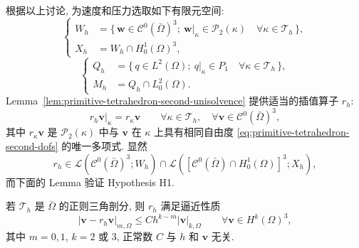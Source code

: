 根据以上讨论, 为速度和压力选取如下有限元空间:
\begin{equation}\label{eq:primitive-tetrahedron-second-velocity-spaces}
\left\{
\begin{aligned}
W_h&=\{\,\mathbf w\in\mathcal C^0(\bar\Omega)^3;
\ \mathbf w|_\kappa\in\mathcal P_2(\kappa)
\quad\forall\kappa\in\mathcal T_h\,\},\\
X_h&=W_h\cap H_0^1(\Omega)^3,
\end{aligned}
\right.
\end{equation}
\begin{equation}\label{eq:primitive-tetrahedron-second-pressure-spaces}
\left\{
\begin{aligned}
Q_h&=\{\,q\in L^2(\Omega);
\ q|_\kappa\in P_1\quad\forall\kappa\in\mathcal T_h\,\},\\
M_h&=Q_h\cap L_0^2(\Omega).
\end{aligned}
\right.
\end{equation}
Lemma~\ref{lem:primitive-tetrahedron-second-unisolvence} 提供适当的插值算子
$r_h$:
\[
r_h\mathbf v|_\kappa=r_\kappa\mathbf v
\qquad\forall\kappa\in\mathcal T_h,
\quad\forall\mathbf v\in\mathcal C^0(\bar\Omega)^3,
\]
其中 $r_\kappa\mathbf v$ 是 $\mathcal P_2(\kappa)$ 中与 $\mathbf v$
在 $\kappa$ 上具有相同自由度
\eqref{eq:primitive-tetrahedron-second-dofs} 的唯一多项式. 显然
\[
r_h\in\mathcal L(\mathcal C^0(\bar\Omega)^3;W_h)
\cap\mathcal L([\mathcal C^0(\bar\Omega)\cap H_0^1(\Omega)]^3;X_h),
\]
而下面的 Lemma 验证 Hypothesis H1.

\setcounter{statement}{9}
\begin{Lemma}\label{lem:primitive-tetrahedron-second-interpolation}
若 $\mathcal T_h$ 是 $\bar\Omega$ 的正则三角剖分, 则 $r_h$ 满足逼近性质
\begin{equation}\label{eq:primitive-tetrahedron-second-interpolation}
|\mathbf v-r_h\mathbf v|_{m,\Omega}
\leq Ch^{k-m}|\mathbf v|_{k,\Omega}
\qquad\forall\mathbf v\in H^k(\Omega)^3,
\end{equation}
其中 $m=0,1$, $k=2$ 或 $3$, 正常数 $C$ 与 $h$ 和 $\mathbf v$ 无关.
\end{Lemma}

